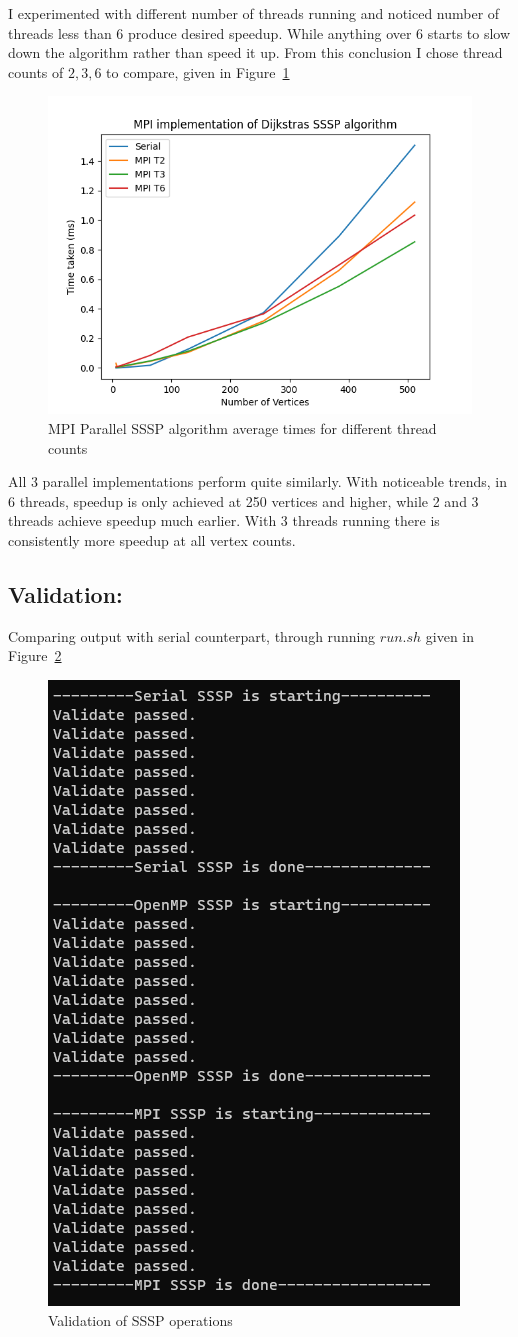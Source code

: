 	I experimented with different number of threads running and noticed number of threads less than 6 produce desired speedup. While anything over 6 starts to slow down the algorithm rather than speed it up. From this conclusion I chose thread counts of $2,3,6$ to compare, given in Figure~\ref{fig:fig_sssp_mpi}
	\begin{figure}[!htb]
		\centering
		\includegraphics[width=0.6\linewidth]{sssp_mpi.png}
		\caption{MPI Parallel SSSP algorithm average times for different thread counts}
		\label{fig:fig_sssp_mpi}
	\end{figure}
	
	All 3 parallel implementations perform quite similarly. With noticeable trends, in 6 threads, speedup is only achieved at 250 vertices and higher, while 2 and 3 threads achieve speedup much earlier. With 3 threads running there is consistently more speedup at all vertex counts.
	
	\newpage
	\subsection{Validation:}
	Comparing output with serial counterpart, through running $run.sh$ given in Figure~\ref{fig:fig_sssp_validation}
	\begin{figure}[!htb]
		\centering
		\includegraphics[height=0.5\linewidth]{sssp_validation.png}
		\caption{Validation of SSSP operations}
		\label{fig:fig_sssp_validation}
	\end{figure}

